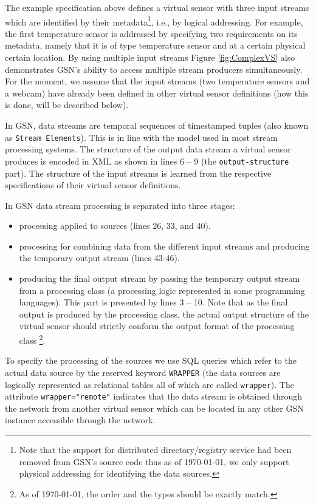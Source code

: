The example specification above defines a virtual sensor with three input streams
which are identified by their metadata\footnote{Note that the support for distributed directory/registry service had been removed
from GSN's source code thus as of \today, we only support physical addressing for identifying the data sources.},
i.e., by logical addressing. For example, the first temperature sensor is
addressed by specifying two requirements on its metadata, namely
that it is of type temperature sensor and at a certain physical certain
location. By using multiple input streams Figure \ref{fig:ComplexVS} also
demonstrates GSN's ability to access multiple stream producers simultaneously.
For the moment, we assume that the input streams (two temperature sensors and a
webcam) have already been defined in other virtual sensor definitions (how this
is done, will be described below).

In GSN, data streams are temporal sequences of timestamped tuples (also known as \texttt{Stream Elements}).
This is in line with the model used in most stream processing systems. The structure of
the output data stream a virtual sensor produces is encoded in XML as shown in lines 6 -- 9 (the \texttt{output-structure} part).
The structure of the input streams is learned from the respective specifications of their virtual sensor definitions. 

In GSN data stream processing is separated into three stages:
\begin{itemize}
\item processing applied to sources (lines 26, 33, and 40).
\item processing for combining data from the different input streams and producing the temporary output stream (lines 43-46).
\item producing the final output stream by passing the temporary output stream from a processing class (a processing logic represented in some programming languages). This part is presented by lines 3 -- 10. Note that as the final output is produced by the processing class, the actual output structure of the virtual sensor should strictly
conform the output format of the processing class \footnote{As of \today, the order and the types should be exactly match.}.
\end{itemize}

To specify the processing of the sources we use SQL queries which refer to the actual data source
by the reserved keyword \verb|WRAPPER| (the data sources are logically represented as relational tables all of which are called \verb|wrapper|).
The attribute \verb|wrapper="remote"| indicates that the data stream is obtained through the
network from another virtual sensor which can be located in any other GSN instance accessible through the network.


